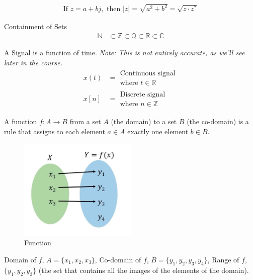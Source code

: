 \begin{definition}
    [Magnitude]
    \begin{align*}
        \text{If } z = a + bj, \text{ then } |z| = \sqrt{a^2 + b^2} = \sqrt{z \cdot z^*}
    \end{align*}
\end{definition}

\begin{remark}
    {Containment of Sets}
    \begin{align*}
        \mathbb{N} & \subset \mathbb{Z} \subset \mathbb{Q} \subset \mathbb{R} \subset \mathbb{C}
    \end{align*}
\end{remark}

\begin{definition}
    [Signal]
    A Signal is a function of time.
    \textit{Note: This is not entirely accurate, as we'll see later in the course.}
    \begin{align*}
        x(t) & = \begin{aligned}
                     \text{Continuous signal} \\
                     \text{where } t \in \mathbb{R}
                 \end{aligned} \\
        x[n] & = \begin{aligned}
                     \text{Discrete signal} \\
                     \text{where } n \in \mathbb{Z}
                 \end{aligned}
    \end{align*}
\end{definition}

\begin{definition}
    [Function]
    A function $f:A \to B$ from a set $A$ (the domain) to a set $B$ (the co-domain) is a rule that assigns to each element $a \in A$ exactly one element $b \in B$.
\end{definition}
\begin{example}
    \begin{figure}[h]
        \centering
        \includegraphics[width=0.5\textwidth]{./LECTURE_2/domain-range-codomain.png}
        \caption{Function}
        \label{fig:function}
    \end{figure}
    Domain of $f$, $A = \{x_1,x_2,x_3\}$, Co-domain of $f$, $B = \{y_1,y_2,y_3,y_4\}$, Range of $f$, $\{y_1,y_2,y_3\}$ (the set that contains all the images of the elements of the domain).
\end{example}

